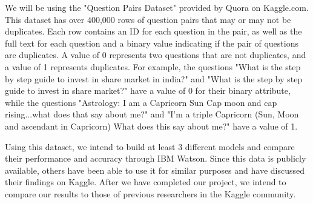 \documentclass{sig-alternate}
\begin{document}
We will be using the "Question Pairs Dataset" provided by Quora on Kaggle.com.\cite{quora:kaggle} This dataset has over 400,000 rows of question pairs that may or may not be duplicates. Each row contains an ID for each question in the pair, as well as the full text for each question and a binary value indicating if the pair of questions are duplicates. A value of 0 represents two questions that are not duplicates, and a value of 1 represents duplicates. For example, the questions "What is the step by step guide to invest in share market in india?" and "What is the step by step guide to invest in share market?" have a value of 0 for their binary attribute, while the questions "Astrology: I am a Capricorn Sun Cap moon and cap rising...what does that say about me?" and "I'm a triple Capricorn (Sun, Moon and ascendant in Capricorn) What does this say about me?" have a value of 1.

Using this dataset, we intend to build at least 3 different models and compare their performance and accuracy through IBM Watson. Since this data is publicly available, others have been able to use it for similar purposes and have discussed their findings on Kaggle. After we have completed our project, we intend to compare our results to those of previous researchers in the Kaggle community.



\balance
\end{document}
